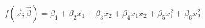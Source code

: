 

\[
f(\vec{x};\vec{\beta}) = \beta_1 + \beta_2x_1 + \beta_3x_2
                       + \beta_4x_1x_2 + \beta_5x_1^2 + \beta_6x_2^2
\]


